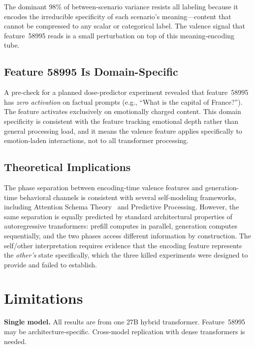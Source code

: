 \documentclass[11pt,a4paper]{article}
\begin{document}
The dominant 98\% of between-scenario variance resists all labeling because
it encodes the irreducible specificity of each scenario's meaning---content
that cannot be compressed to any scalar or categorical label. The valence
signal that feature~58995 reads is a small perturbation on top of this
meaning-encoding tube.

\subsection{Feature 58995 Is Domain-Specific}

A pre-check for a planned dose-predictor experiment revealed that
feature~58995 has \emph{zero activation} on factual prompts (e.g., ``What
is the capital of France?''). The feature activates exclusively on
emotionally charged content. This domain specificity is consistent with
the feature tracking emotional depth rather than general processing load,
and it means the valence feature applies specifically to
emotion-laden interactions, not to all transformer processing.

\subsection{Theoretical Implications}

The phase separation between encoding-time valence features and
generation-time behavioral channels is consistent with several
self-modeling frameworks, including Attention Schema
Theory~\citep{graziano2015attention} and Predictive Processing. However,
the same separation is equally predicted by standard architectural
properties of autoregressive transformers: prefill computes in
parallel, generation computes sequentially, and the two phases access
different information by construction. The self/other interpretation
requires evidence that the encoding feature represents the
\emph{other's} state specifically, which the three killed experiments
were designed to provide and failed to establish.

\section{Limitations}
\label{sec:limitations}

\textbf{Single model.} All results are from one 27B hybrid transformer.
Feature~58995 may be architecture-specific. Cross-model replication with
dense transformers is needed.
\end{document}
